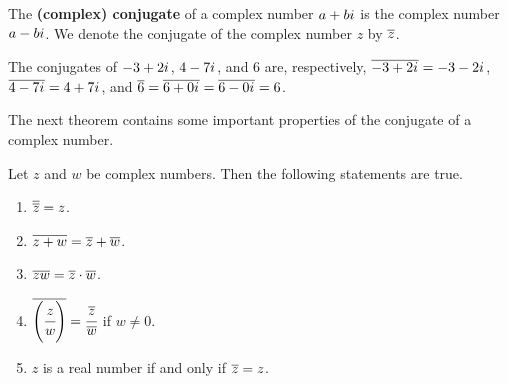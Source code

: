 \begin{appendix definition} \label{def d.2}
The \textbf{(complex) conjugate} of a complex number \(a + b{i\mkern1mu}\) is the complex number \(a - b{i\mkern1mu}\).
We denote the conjugate of the complex number \(z\) by \(\overline{z}\).
\end{appendix definition}

\begin{example}
The conjugates of \(-3 + 2{i\mkern1mu}\), \(4 - 7{i\mkern1mu}\), and \(6\) are, respectively,
\(\overline{-3 + 2{i\mkern1mu}} = -3 - 2{i\mkern1mu}\), \(\overline{4 - 7{i\mkern1mu}} = 4 + 7{i\mkern1mu}\), and \(\overline{6} = \overline{6 + 0{i\mkern1mu}} = \overline{6 - 0{i\mkern1mu}} = 6\).
\end{example}

The next theorem contains some important properties of the conjugate of a complex number.

\begin{appendix theorem} \label{thm d.2}
Let \(z\) and \(w\) be complex numbers.
Then the following statements are true.

\begin{enumerate}
\item \(\overline{\overline{z}} = z\).
\item \(\overline{z + w} = \overline{z} + \overline{w}\).
\item \(\overline{zw} = \overline{z} \cdot \overline{w}\).
\item \(\overline{\left( \cfrac{z}{w} \right)} = \cfrac{\overline{z}}{\overline{w}}\) if \(w \ne 0\).
\item \(z\) is a real number if and only if \(\overline{z} = z\).
\end{enumerate}
\end{appendix theorem}


